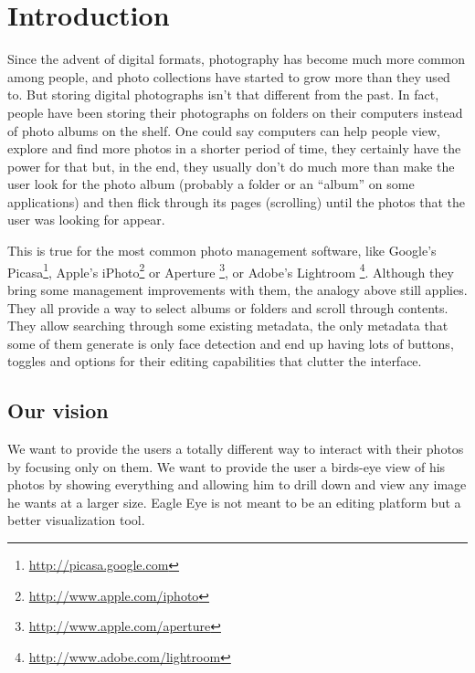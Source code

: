 \chapter{Introduction} %
\label{chapter:introduction}



Since the advent of digital formats, photography has become much more common among people, and photo collections have started to grow more than they used to. But storing digital photographs isn't that different from the past. In fact, people have been storing their photographs on folders on their computers instead of photo albums on the shelf. One could say computers can help people view, explore and find more photos in a shorter period of time, they certainly have the power for that but, in the end, they usually don't do much more than make the user look for the photo album (probably a folder or an ``album'' on some applications) and then flick through its pages (scrolling) until the photos that the user was looking for appear.

This is true for the most common photo management software, like Google's Picasa\footnote{\url{http://picasa.google.com}}, Apple's iPhoto\footnote{\url{http://www.apple.com/iphoto}} or Aperture \footnote{\url{http://www.apple.com/aperture}}, or Adobe's Lightroom \footnote{\url{http://www.adobe.com/lightroom}}. Although they bring some management improvements with them, the analogy above still applies. They all provide a way to select albums or folders and scroll through contents. They allow searching through some existing metadata, the only metadata that some of them generate is only face detection and end up having lots of buttons, toggles and options for their editing capabilities that clutter the interface.




\section{Our vision} %
\label{ssub:our_vision}


We want to provide the users a totally different way to interact with their photos by focusing only on them. We want to provide the user a birds-eye view of his photos by showing everything and allowing him to drill down and view any image he wants at a larger size. Eagle Eye is not meant to be an editing platform but a better visualization tool.

